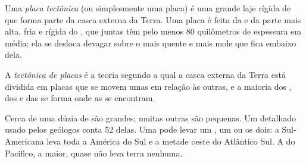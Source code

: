 \begin{definition}\label{def:g7:plate-tectonics:plate}
Uma \emph{placa tectônica} (ou simplesmente uma
placa) é uma grande laje rígida de  que forma parte da casca externa
da Terra. Uma placa é feita da  e da parte mais alta, fria e rígida
do , que juntas têm pelo menos 80 quilômetros de espessura em média;
ela se desloca devagar sobre o  mais quente e mais mole que fica
embaixo dela.
\end{definition}

\begin{definition}\label{def:g7:plate-tectonics:plate-tectonics}
A \emph{tectônica de placas} é a teoria segundo a
qual a casca externa da Terra está dividida em placas que se movem umas em
relação às outras, e a maioria dos , dos  e das
 se forma onde as  se encontram.
\end{definition}

\begin{remark}\label{rem:g7:plate-tectonics:how-many}
Cerca de uma dúzia de  são grandes; muitas outras são pequenas. Um
 detalhado usado pelos geólogos conta 52 delas. Uma  pode levar um
, um  ou os dois: a  Sul-Americana leva toda a
América do Sul e a metade oeste do Atlântico Sul. A  do Pacífico, a
maior, quase não leva terra nenhuma.
\end{remark}

